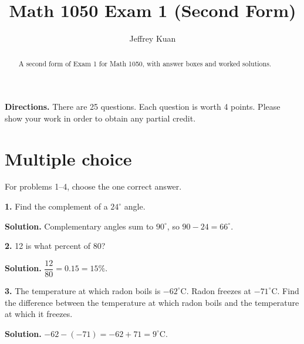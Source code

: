 \documentclass{ximera}
\author{Jeffrey Kuan}
\title{Math 1050 Exam 1 (Second Form)}
\begin{document}
\begin{abstract}
    A second form of Exam 1 for Math 1050, with answer boxes and worked solutions.
\end{abstract}

\maketitle

\textbf{Directions.} There are 25 questions. Each question is worth 4 points. Please show
your work in order to obtain any partial credit.

\section*{Multiple choice}

For problems 1--4, choose the one correct answer.

\begin{problem}

\textbf{1.} Find the complement of a $24^{\circ}$ angle.

\begin{multipleChoice}
\end{multipleChoice}

\begin{hint}
\textbf{Solution.} Complementary angles sum to $90^{\circ}$, so $90-24=66^{\circ}$.
\end{hint}
\end{problem}

\begin{problem}

\textbf{2.} 12 is what percent of 80?

\begin{multipleChoice}
\end{multipleChoice}

\begin{hint}
\textbf{Solution.} $\dfrac{12}{80}=0.15=15\%$.
\end{hint}
\end{problem}

\begin{problem}

\textbf{3.} The temperature at which radon boils is $-62^{\circ}\mathrm{C}$. Radon freezes at
$-71^{\circ}\mathrm{C}$. Find the difference between the temperature at which radon boils and
the temperature at which it freezes.

\begin{multipleChoice}
\end{multipleChoice}

\begin{hint}
\textbf{Solution.} $-62-(-71)=-62+71=9^{\circ}\mathrm{C}$.
\end{hint}
\end{problem}
\end{document}
